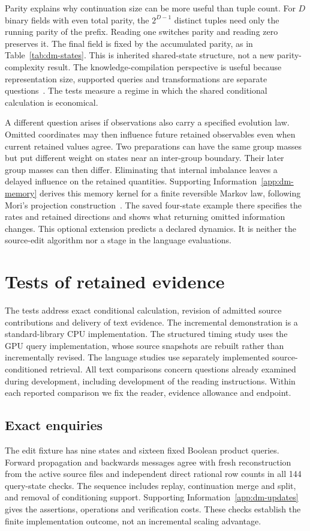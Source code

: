 \documentclass[reprint,aps,prx,superscriptaddress,nofootinbib,longbibliography]{revtex4-2}
\begin{document}
Parity explains why continuation size can be more useful than tuple count.
For \(D\) binary fields with even total parity, the \(2^{D-1}\) distinct tuples need only the running parity of the prefix.
Reading one switches parity and reading zero preserves it.
The final field is fixed by the accumulated parity, as in Table~\ref{tab:dm-states}.
This is inherited shared-state structure, not a new parity-complexity result.
The knowledge-compilation perspective is useful because representation size, supported queries and transformations are separate questions~\cite{darwiche2002}.
The tests measure a regime in which the shared conditional calculation is economical.

A different question arises if observations also carry a specified evolution law.
Omitted coordinates may then influence future retained observables even when current retained values agree.
Two preparations can have the same group masses but put different weight on states near an inter-group boundary.
Their later group masses can then differ.
Eliminating that internal imbalance leaves a delayed influence on the retained quantities.
Supporting Information~\ref{app:dm-memory} derives this memory kernel for a finite reversible Markov law, following Mori's projection construction~\cite{mori}.
The saved four-state example there specifies the rates and retained directions and shows what returning omitted information changes.
This optional extension predicts a declared dynamics.
It is neither the source-edit algorithm nor a stage in the language evaluations.

\section{Tests of retained evidence}
\label{section:delivery-under-a-fixed-reader}
The tests address exact conditional calculation, revision of admitted source contributions and delivery of text evidence.
The incremental demonstration is a standard-library CPU implementation.
The structured timing study uses the GPU query implementation, whose source snapshots are rebuilt rather than incrementally revised.
The language studies use separately implemented source-conditioned retrieval.
All text comparisons concern questions already examined during development, including development of the reading instructions.
Within each reported comparison we fix the reader, evidence allowance and endpoint.

\subsection{Exact enquiries}
The edit fixture has nine states and sixteen fixed Boolean product queries.
Forward propagation and backwards messages agree with fresh reconstruction from the active source files and independent direct rational row counts in all 144 query-state checks.
The sequence includes replay, continuation merge and split, and removal of conditioning support.
Supporting Information~\ref{app:dm-updates} gives the assertions, operations and verification costs.
These checks establish the finite implementation outcome, not an incremental scaling advantage.
\end{document}
